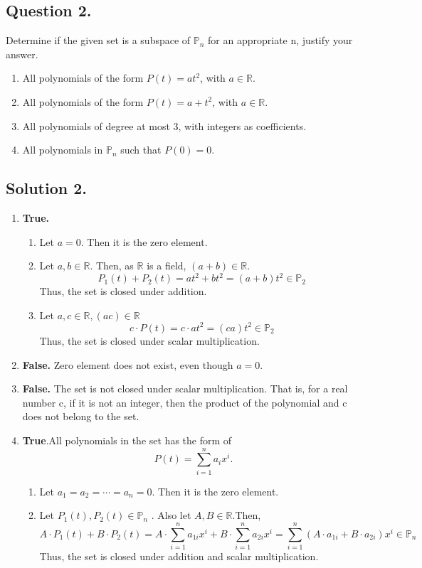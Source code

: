 \documentclass{article}
\begin{document}
\subsection*{Question 2.}
Determine if the given set is a subspace of $\mathbb{P}_n$ for an appropriate n, justify your answer.
\begin{enumerate}
    \item All polynomials of the form $P(t)=at^2$, with $a\in \mathbb{R}$.
    \item All polynomials of the form $P(t)=a+t^2$, with $a\in \mathbb{R}$.
    \item All polynomials of degree at most 3, with integers as coefficients.
    \item All polynomials in $\mathbb{P}_n$ such that $P(0)=0$.
\end{enumerate}
\subsection*{Solution 2.}
\begin{enumerate}
    \item \textbf{True.}
    \begin{enumerate}
        \item Let $a=0$. Then it is the zero element.
        \item Let $a,b\in\mathbb{R}$. Then, as $\mathbb{R}$ is a field, $(a+b)\in\mathbb{R}$.
        \[P_1(t)+P_2(t)=at^2+bt^2=(a+b)t^2\in\mathbb{P}_2\]
        Thus, the set is closed under addition.
        \item Let $a,c\in\mathbb{R},(ac)\in\mathbb{R}$
        \[c\cdot P(t)=c\cdot at^2=(ca)t^2\in\mathbb{P}_2\]
        Thus, the set is closed under scalar multiplication.
    \end{enumerate}
    
    \item \textbf{False.} Zero element does not exist, even though $a=0$.
    \item \textbf{False.} The set is not closed under scalar multiplication. That is, for a real number c, if it is not an integer, then the product of the polynomial and c does not belong to the set.
    \item \textbf{True}.All polynomials in the set has the form of 
    \[P(t)=\sum_{i=1}^n a_ix^i.\]
    \begin{enumerate}
        \item Let $a_1=a_2=\cdots=a_n=0$. Then it is the zero element.
        \item Let $P_1(t), P_2(t)\in\mathbb{P}_n$ . Also let $A,B\in\mathbb{R}$.Then,
        \[A\cdot P_1(t)+B\cdot P_2(t)=A\cdot \sum_{i=1}^n a_{1i}x^i+B\cdot \sum_{i=1}^n a_{2i}x^i=\sum_{i=1}^n (A\cdot a_{1i}+B\cdot a_{2i})x^i\in\mathbb{P}_n\]
        Thus, the set is closed under addition and scalar multiplication.
    \end{enumerate}
    
\end{enumerate}
\end{document}
